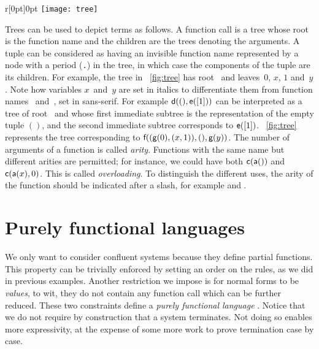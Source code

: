%
\begin{wrapfigure}[8]{r}[0pt]{0pt}
\centering
\texttt{[image: tree]}%
\caption{}\label{fig:tree}
\end{wrapfigure}
Trees can be used to depict terms as follows. A function call is a
tree whose root is the function name and the children are the trees
denoting the arguments. A tuple can be considered as having an
invisible function name represented by a node with a period
(\texttt{.}) in the tree, in which case the components of the tuple
are its children. For example, the tree in \fig~\vref{fig:tree} has
root~ and leaves~\(0\), \(x\), \(1\) and~\(y\). Note how
variables \(x\)~and~\(y\) are set in italics to differentiate them
from function names ~and~, set in
\textsf{sans\hyp{}serif}. For example \(\textsf{d}((), \textsf{e}([1]))\)
can be interpreted as a tree of root~ and whose first immediate
subtree is the representation of the empty tuple \(()\), and the
second immediate subtree corresponds to
\(\textsf{e}([1])\). \Fig~\ref{fig:tree} represents the tree
corresponding to \(\textsf{f}((\textsf{g}(0),(x,1)),(),\textsf{g}(y))\). The
number of arguments of a function is called
\emph{arity}. Functions with the same
name but different arities are permitted; for instance, we could have
both \(\textsf{c}(\textsf{a}())\) and \(\textsf{c}(\textsf{a}(x),0)\). This is
called \emph{overloading}. To
distinguish the different uses, the arity of the function should be
indicated after a slash, for example  and .

\section{Purely functional languages}
\label{sec:functional}

We only want to consider confluent systems because they define partial
functions. This property can be trivially enforced by setting an order
on the rules, as we did in previous examples. Another restriction we
impose is for normal forms to be \emph{values}, to wit, they do not contain any function call which
can be further reduced. These two constraints define a \emph{purely
functional language} \citep{Hughes_1989,Hinsen_2009}. Notice that we do not require by construction that a
system terminates. Not doing so enables more expressivity, at the
expense of some more work to prove termination case by case.

